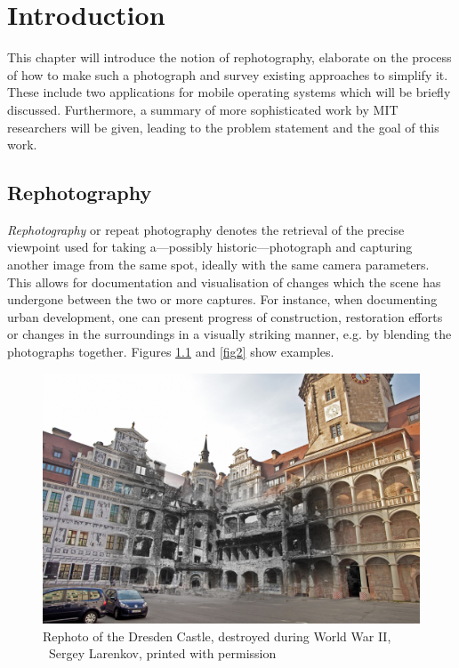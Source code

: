 \chapter{Introduction}

This chapter will introduce the notion of rephotography, elaborate on the
process of how to make such a photograph and survey existing approaches to
simplify it. These include two applications for mobile operating systems which
will be briefly discussed. Furthermore, a summary of more sophisticated work by
MIT researchers will be given, leading to the problem statement and the goal of
this work.

\section{Rephotography}

\emph{Rephotography} or repeat photography denotes the retrieval of the precise
viewpoint used for taking a---possibly historic---photograph and capturing
another image from the same spot, ideally with the same camera parameters. This
allows for documentation and visualisation of changes which the scene has
undergone between the two or more captures.  For instance, when documenting urban
development, one can present progress of construction, restoration efforts or
changes in the surroundings in a visually striking manner, e.g. by blending the
photographs together.  Figures \ref{fig1} and \ref{fig2} show examples.

\begin{figure}
   \includegraphics[width=\textwidth]{gfx/1945_2014_Residenzschloss_small.jpg}
   \caption[Rephoto of Dresden Castle]{Rephoto of the Dresden Castle, destroyed during World War II,
   \textcopyright\ Sergey Larenkov, printed with permission}
   \label{fig1}
\end{figure}

